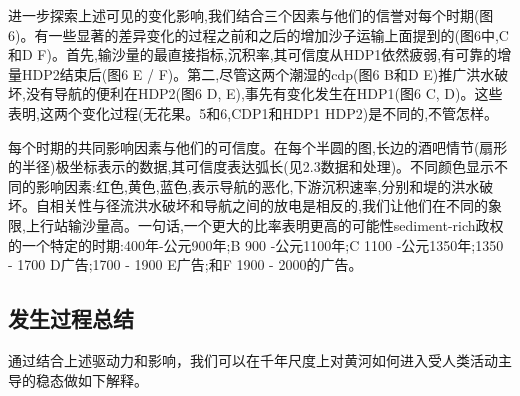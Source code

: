 进一步探索上述可见的变化影响,我们结合三个因素与他们的信誉对每个时期(图6)。有一些显著的差异变化的过程之前和之后的增加沙子运输上面提到的(图6中,C和D F)。首先,输沙量的最直接指标,沉积率,其可信度从HDP1依然疲弱,有可靠的增量HDP2结束后(图6 E / F)。第二,尽管这两个潮湿的cdp(图6 B和D E)推广洪水破坏,没有导航的便利在HDP2(图6 D, E),事先有变化发生在HDP1(图6 C, D)。这些表明,这两个变化过程(无花果。5和6,CDP1和HDP1 HDP2)是不同的,不管怎样。

每个时期的共同影响因素与他们的可信度。在每个半圆的图,长边的酒吧情节(扇形的半径)极坐标表示的数据,其可信度表达弧长(见2.3数据和处理)。不同颜色显示不同的影响因素:红色,黄色,蓝色,表示导航的恶化,下游沉积速率,分别和堤的洪水破坏。自相关性与径流洪水破坏和导航之间的放电是相反的,我们让他们在不同的象限,上行站输沙量高。一句话,一个更大的比率表明更高的可能性sediment-rich政权的一个特定的时期:400年-公元900年;B 900 -公元1100年;C 1100 -公元1350年;1350 - 1700 D广告;1700 - 1900 E广告;和F 1900 - 2000的广告。

\subsection{发生过程总结}
通过结合上述驱动力和影响，我们可以在千年尺度上对黄河如何进入受人类活动主导的稳态做如下解释。
